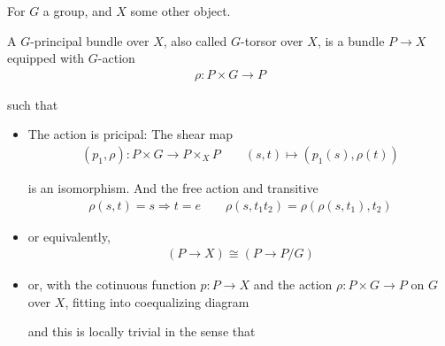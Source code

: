 \documentclass[Total.tex]{subfiles}
\begin{document}
			\begin{Def}
				For $G$ a group, and $X$ some other object.
				
				A $G$-principal bundle over $X$, also called $G$-torsor over $X$, is a bundle $P\rightarrow X$ equipped with $G$-action
				\begin{gather*}
					\rho:P\times G\rightarrow P
				\end{gather*}
				
				such that
				\begin{itemize}
					\item The action is pricipal: The shear map
					\begin{gather*}
						(p_1,\rho):P\times G\rightarrow P\times_X P\qquad (s,t)\mapsto (p_1(s),\rho(t))
					\end{gather*}
					
					is an isomorphism. And the free action and transitive
					\begin{gather*}
						\rho(s,t)=s\Rightarrow t=e\qquad \rho(s,t_1t_2)=\rho(\rho(s,t_1),t_2)
					\end{gather*}
					\item or equivalently,
					\begin{gather*}
						(P\rightarrow X)\cong (P\rightarrow P/G)
					\end{gather*}
					\item or, with the cotinuous function $p:P\rightarrow X$ and the action $\rho:P\times G\rightarrow P$ on $G$ over $X$, fitting into coequalizing diagram
					\begin{center}
					\end{center}
					
					and this is locally trivial in the sense that
					\begin{center}
					\end{center}
				\end{itemize}
			\end{Def}
			
\end{document}
